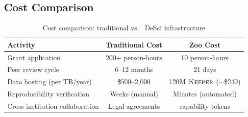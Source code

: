 \subsection{Cost Comparison}

\begin{table}[h]
\centering
\begin{tabular}{lcc}
\toprule
\textbf{Activity} & \textbf{Traditional Cost} & \textbf{Zoo Cost} \\
\midrule
Grant application & 200+ person-hours & 10 person-hours \\
Peer review cycle & 6--12 months & 21 days \\
Data hosting (per TB/year) & \$500--2,000 & 120M $\textsc{Keeper}$ ($\sim$\$240) \\
Reproducibility verification & Weeks (manual) & Minutes (automated) \\
Cross-institution collaboration & Legal agreements & \DID{} capability tokens \\
\bottomrule
\end{tabular}
\caption{Cost comparison: traditional vs.\ \Zoo{} DeSci infrastructure}
\label{tab:cost_comparison}
\end{table}

